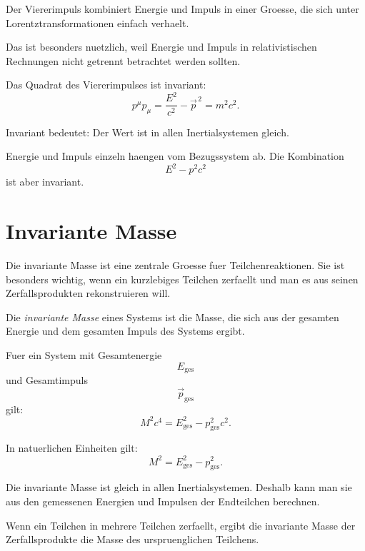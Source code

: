 \begin{conceptbox}
Der Viererimpuls kombiniert Energie und Impuls in einer Groesse, die sich unter
Lorentztransformationen einfach verhaelt.

Das ist besonders nuetzlich, weil Energie und Impuls in relativistischen Rechnungen
nicht getrennt betrachtet werden sollten.
\end{conceptbox}

\begin{formulabox}
Das Quadrat des Viererimpulses ist invariant:
\[
    p^\mu p_\mu
    =
    \frac{E^2}{c^2}
    -
    \vec p^{\,2}
    =
    m^2c^2.
\]
\end{formulabox}

\begin{conceptbox}
Invariant bedeutet:
Der Wert ist in allen Inertialsystemen gleich.

Energie und Impuls einzeln haengen vom Bezugssystem ab.
Die Kombination
\[
    E^2-p^2c^2
\]
ist aber invariant.
\end{conceptbox}

\section{Invariante Masse}

Die invariante Masse ist eine zentrale Groesse fuer Teilchenreaktionen.
Sie ist besonders wichtig, wenn ein kurzlebiges Teilchen zerfaellt und man es aus
seinen Zerfallsprodukten rekonstruieren will.

\begin{definitionbox}
Die \emph{invariante Masse} eines Systems ist die Masse, die sich aus der gesamten
Energie und dem gesamten Impuls des Systems ergibt.
\end{definitionbox}

\begin{formulabox}
Fuer ein System mit Gesamtenergie
\[
    E_{\mathrm{ges}}
\]
und Gesamtimpuls
\[
    \vec p_{\mathrm{ges}}
\]
gilt:
\[
    M^2c^4
    =
    E_{\mathrm{ges}}^2
    -
    p_{\mathrm{ges}}^2c^2.
\]
\end{formulabox}

\begin{formulabox}
In natuerlichen Einheiten gilt:
\[
    M^2
    =
    E_{\mathrm{ges}}^2
    -
    p_{\mathrm{ges}}^2.
\]
\end{formulabox}

\begin{conceptbox}
Die invariante Masse ist gleich in allen Inertialsystemen.
Deshalb kann man sie aus den gemessenen Energien und Impulsen der Endteilchen
berechnen.

Wenn ein Teilchen in mehrere Teilchen zerfaellt, ergibt die invariante Masse der
Zerfallsprodukte die Masse des urspruenglichen Teilchens.
\end{conceptbox}

